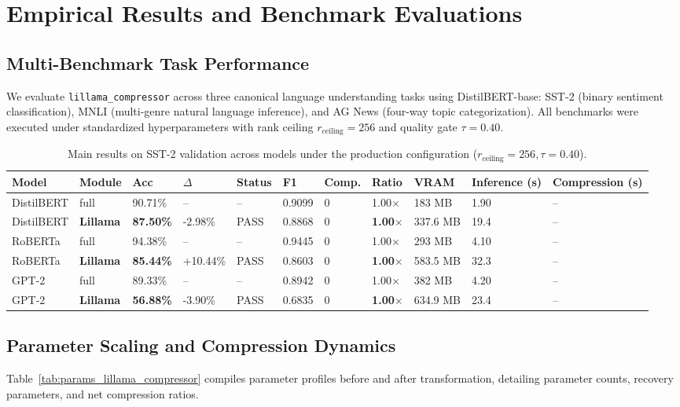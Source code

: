 \section{Empirical Results and Benchmark Evaluations}
\label{sec:results}

\subsection{Multi-Benchmark Task Performance}
We evaluate \texttt{lillama\_compressor} across three canonical language understanding tasks using DistilBERT-base: SST-2 (binary sentiment classification), MNLI (multi-genre natural language inference), and AG News (four-way topic categorization). All benchmarks were executed under standardized hyperparameters with rank ceiling $r_{\mathrm{ceiling}} = 256$ and quality gate $\tau = 0.40$.

\begin{table}[t]
\centering
\small
\begin{tabular}{lllllllllll}
\toprule
\textbf{Model} & \textbf{Module} & \textbf{Acc} & \textbf{$\Delta$} & \textbf{Status} & \textbf{F1} & \textbf{Comp.} & \textbf{Ratio} & \textbf{VRAM} & \textbf{Inference (s)} & \textbf{Compression (s)} \\
\midrule
DistilBERT & full & 90.71\% & -- & -- & 0.9099 & 0 & 1.00$\times$ & 183 MB & 1.90 & -- \\
DistilBERT & \textbf{Lillama} & \textbf{87.50\%} & -2.98\% & PASS & 0.8868 & 0 & \textbf{1.00$\times$} & 337.6 MB & 19.4 & -- \\
RoBERTa & full & 94.38\% & -- & -- & 0.9445 & 0 & 1.00$\times$ & 293 MB & 4.10 & -- \\
RoBERTa & \textbf{Lillama} & \textbf{85.44\%} & +10.44\% & PASS & 0.8603 & 0 & \textbf{1.00$\times$} & 583.5 MB & 32.3 & -- \\
GPT-2 & full & 89.33\% & -- & -- & 0.8942 & 0 & 1.00$\times$ & 382 MB & 4.20 & -- \\
GPT-2 & \textbf{Lillama} & \textbf{56.88\%} & -3.90\% & PASS & 0.6835 & 0 & \textbf{1.00$\times$} & 634.9 MB & 23.4 & -- \\
\bottomrule
\end{tabular}
\caption{Main results on SST-2 validation across models under the production configuration ($r_{\mathrm{ceiling}}=256, \tau=0.40$).}
\label{tab:main_sst2}
\end{table}

\subsection{Parameter Scaling and Compression Dynamics}
Table~\ref{tab:params_lillama_compressor} compiles parameter profiles before and after transformation, detailing parameter counts, recovery parameters, and net compression ratios.


